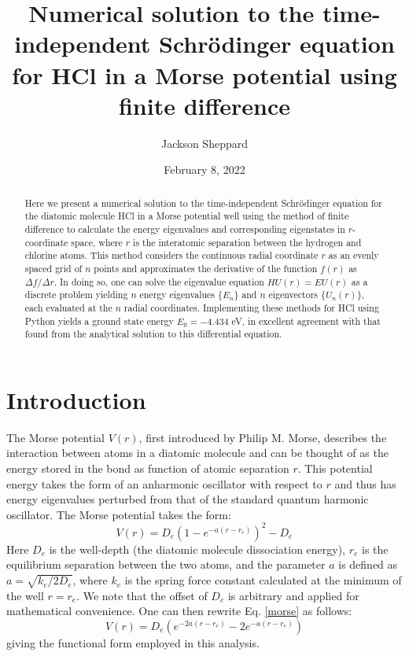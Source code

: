 \documentclass[%
aps, %
prl, %
preprint, %
12pt, %
amsfonts, %
amssymb, %
amsmath, %
endfloats,%
raggedbottom, %
]{revtex4-1}
\begin{document}

\title{Numerical solution to the time-independent Schrödinger equation for HCl in a Morse potential using finite difference}
\author{Jackson Sheppard}

\begin{abstract}
Here we present a numerical solution to the time-independent Schrödinger equation for the diatomic molecule HCl in a Morse potential well using the method of finite difference to calculate the energy
eigenvalues and corresponding eigenstates in $r$-coordinate space, where $r$ is the interatomic
separation between the hydrogen and chlorine atoms. This method considers the continuous radial
coordinate $r$ as an evenly spaced grid of $n$ points and approximates the derivative of the
function $f(r)$ as $\Delta f/ \Delta r$. In doing so, one can solve the eigenvalue equation
$HU(r) = EU(r)$ as a discrete problem yielding $n$ energy eigenvalues $\{E_n\}$ and $n$ eigenvectors $\{U_n(r)\}$, each
evaluated at the $n$ radial coordinates. Implementing these methods for HCl using
Python yields a ground state energy $E_0 = -4.434$ eV, in excellent agreement with that found from
the analytical solution to this differential equation.
\end{abstract}

\date{February 8, 2022}
\maketitle

\section{\label{sec:Intro}Introduction}

The Morse potential $V(r)$, first introduced by Philip M. Morse, describes the interaction between
atoms in a diatomic molecule and can be thought of as the energy stored in the bond as function of atomic
separation $r$. This potential energy takes the form of an anharmonic oscillator with respect to
$r$ and thus has energy eigenvalues perturbed from that of the standard quantum harmonic
oscillator. The Morse potential takes the form:
\begin{equation} \label{morse}
    V(r) = D_e(1 - e^{-a(r - r_e)})^2 - D_e
\end{equation}
Here $D_e$ is the well-depth (the diatomic molecule dissociation energy), $r_e$ is the equilibrium
separation between the two atoms, and the parameter $a$ is defined as $a = \sqrt{k_e/2D_e}$,
where $k_e$ is the spring force constant calculated at the minimum of the well $r = r_e$.
We note that the offset of $D_e$ is arbitrary and applied for mathematical convenience. One can 
then rewrite Eq. \ref{morse} as follows:
\begin{equation} \label{morse2}
    V(r) = D_e(e^{-2a(r-r_e)} - 2e^{-a(r-r_e)})    
\end{equation}
giving the functional form employed in this analysis.
\end{document}
